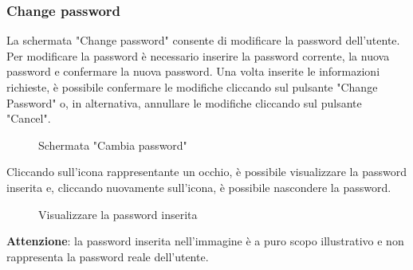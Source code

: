 \subsubsection{Change password}
La schermata "Change password" consente di modificare la password dell'utente. Per modificare la password è necessario inserire la password corrente, la nuova password e confermare la nuova password. Una volta inserite le informazioni richieste, è possibile confermare le modifiche cliccando sul pulsante "Change Password" o, in alternativa, annullare le modifiche cliccando sul pulsante "Cancel".
\begin{figure}[H]
    \centering
    \caption{Schermata "Cambia password"}
    \label{fig:my_label}
\end{figure}
Cliccando sull'icona rappresentante un occhio, è possibile visualizzare la password inserita e, cliccando nuovamente sull'icona, è possibile nascondere la password.
\begin{figure}[H]
    \centering
    \caption{Visualizzare la password inserita}
    \label{fig:my_label}
\end{figure}
\begin{center}
    \textbf{Attenzione}: la password inserita nell'immagine è a puro scopo illustrativo e non rappresenta la password reale dell'utente.\\
\end{center}
 